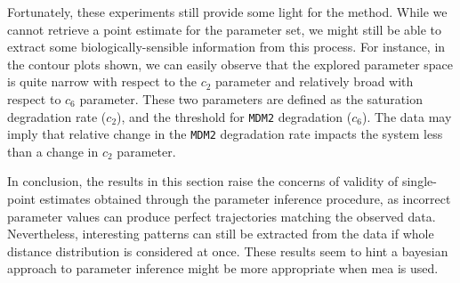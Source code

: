 Fortunately, these experiments still provide some light for the method.
While we cannot retrieve a point estimate for the parameter set, we might still be able to extract some biologically-sensible information from this process. 
For instance, in the contour plots shown, we can easily observe that the explored parameter space is quite narrow with respect to the $c_2$ parameter and relatively broad with respect to $c_6$ parameter. 
These two parameters are defined as the saturation \pft{} degradation rate ($c_2$), and the threshold for \verb"MDM2" degradation ($c_6$)\cite{ale_general_2013}.
The data may imply that relative change in the \verb"MDM2" degradation rate impacts the system less than a change in $c_2$ parameter.

In conclusion, the results in this section raise the concerns of validity of single-point estimates obtained through the parameter inference procedure, as incorrect parameter values can produce perfect trajectories matching the observed data.
Nevertheless, interesting patterns can still be extracted from the data if whole distance distribution is considered at once. 
These results seem to hint a bayesian approach to parameter inference might be more appropriate when \acrlong{mea} is used.




